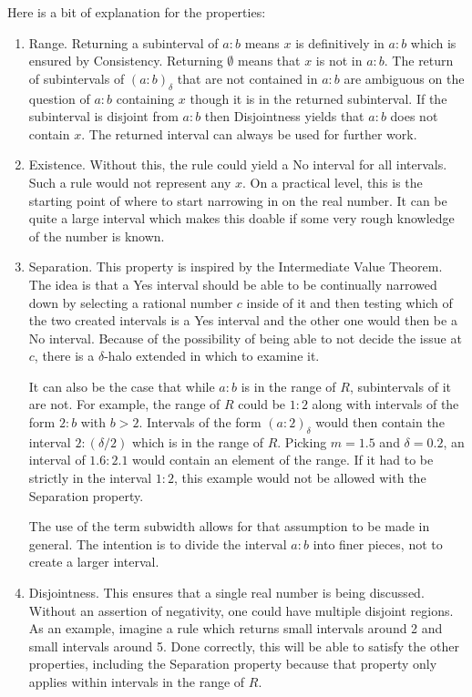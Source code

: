 \documentclass[12pt]{article}
\begin{document}
Here is a bit of explanation for the properties:
\begin{enumerate}
    \item Range. Returning a subinterval of $a:b$ means $x$ is definitively in $a:b$ which is ensured by Consistency. Returning $\emptyset$ means that $x$ is not in $a:b$. The return of subintervals of $(a:b)_\delta$ that are not contained in $a:b$ are ambiguous on the question of $a:b$ containing $x$ though it is in the returned subinterval. If the subinterval is disjoint from $a:b$ then Disjointness yields that $a:b$ does not contain $x$. The returned interval can always be used for further work.  
    
    \item Existence. Without this, the rule could yield a No interval for all intervals. Such a rule would not represent any $x$. On a practical level, this is the starting point of where to start narrowing in on the real number. It can be quite a large interval which makes this doable if some very rough knowledge of the number is known. 
    
    \item Separation. This property is inspired by the Intermediate Value Theorem. The idea is that a Yes interval should be able to be continually narrowed down by selecting a rational number $c$ inside of it and then testing which of the two created intervals is a Yes interval and the other one would then be a No interval. Because of the possibility of being able to not decide the issue at $c$, there is a $\delta$-halo extended in which to examine it. 
    
    It can also be the case that while $a:b$ is in the range of $R$, subintervals of it are not. For example, the range of $R$ could be $1:2$ along with intervals of the form $2:b$ with $b >2$. Intervals of the form $(a:2)_{\delta}$ would then contain the interval $2:(\delta/2)$ which is in the range of $R$. Picking $m=1.5$ and $\delta = 0.2$, an interval of $1.6:2.1$ would contain an element of the range. If it had to be strictly in the interval $1:2$, this example would not be allowed with the Separation property. 

    The use of the term subwidth allows for that assumption to be made in general. The intention is to divide the interval $a:b$ into finer pieces, not to create a larger interval. 
 
    \item Disjointness. This ensures that a single real number is being discussed. Without an assertion of negativity, one could have multiple disjoint regions.  As an example, imagine a rule which returns small intervals around 2 and small intervals around 5. Done correctly, this will be able to satisfy the other properties, including the Separation property because that property only applies within intervals in the range of $R$. 
    

\end{enumerate}
\end{document}
